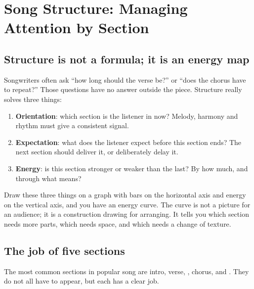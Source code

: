 \chapter{Song Structure: Managing Attention by Section}
\label{ch:structure}


\section{Structure is not a formula; it is an energy map}
\label{sec:structure-map}

Songwriters often ask ``how long should the verse be?'' or ``does the chorus have to repeat?'' Those questions have no answer outside the piece. Structure really solves three things:

\begin{enumerate}
\item \textbf{Orientation}: which section is the listener in now? Melody, harmony and rhythm must give a consistent signal.
\item \textbf{Expectation}: what does the listener expect before this section ends? The next section should deliver it, or deliberately delay it.
\item \textbf{Energy}: is this section stronger or weaker than the last? By how much, and through what means?
\end{enumerate}

Draw these three things on a graph with bars on the horizontal axis and energy on the vertical axis, and you have an energy curve. The curve is not a picture for an audience; it is a construction drawing for arranging. It tells you which section needs more parts, which needs space, and which needs a change of texture.

\section{The job of five sections}
\label{sec:section-functions}

The most common sections in popular song are intro, verse, , chorus,  and . They do not all have to appear, but each has a clear job.


